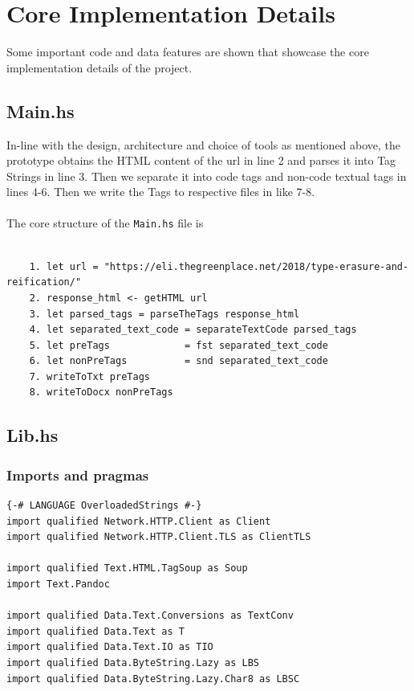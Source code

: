 \documentclass[12pt]{scrreprt}
\begin{document}
\newpage 
\section{Core Implementation Details}

Some important code and data features are shown that showcase the core implementation details of the project.



\subsection{Main.hs}

In-line with the design, architecture and choice of tools as mentioned above, the prototype obtains the HTML content of the url in line 2 and parses it into Tag Strings in line 3. Then we separate it into code tags and non-code textual tags in lines 4-6. Then we write the Tags to respective files in like 7-8.\\
\\ The core structure of the \texttt{Main.hs} file is
\begin{verbatim}

    1. let url = "https://eli.thegreenplace.net/2018/type-erasure-and-reification/"
    2. response_html <- getHTML url
    3. let parsed_tags = parseTheTags response_html
    4. let separated_text_code = separateTextCode parsed_tags
    5. let preTags             = fst separated_text_code
    6. let nonPreTags          = snd separated_text_code
    7. writeToTxt preTags
    8. writeToDocx nonPreTags

\end{verbatim}

\subsection{Lib.hs}

\subsubsection{Imports and pragmas}

\begin{verbatim}
{-# LANGUAGE OverloadedStrings #-}
import qualified Network.HTTP.Client as Client
import qualified Network.HTTP.Client.TLS as ClientTLS

import qualified Text.HTML.TagSoup as Soup
import Text.Pandoc

import qualified Data.Text.Conversions as TextConv
import qualified Data.Text as T
import qualified Data.Text.IO as TIO
import qualified Data.ByteString.Lazy as LBS
import qualified Data.ByteString.Lazy.Char8 as LBSC

\end{verbatim}
\end{document}
